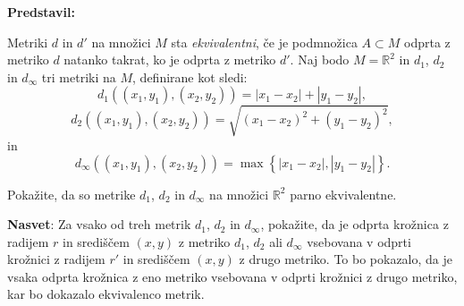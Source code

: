 \textbf{Predstavil: }

Metriki $d$ in $d'$ na množici $M$ sta \emph{ekvivalentni}, če je podmnožica $A \subset M$ odprta z metriko $d$ natanko takrat, ko je odprta z metriko $d'$.
Naj bodo $M = \mathbb{R}^{2}$ in $d_{1}$, $d_{2}$ in $d_{\infty}$ tri metriki na $M$, definirane kot sledi: \[d_{1} \left( (x_{1}, y_{1}), (x_{2}, y_{2}) \right) = |x_{1} - x_{2}| + |y_{1} - y_{2}|,\] \[d_{2} \left( (x_{1}, y_{1}), (x_{2}, y_{2}) \right) = \sqrt{(x_{1} - x_{2})^{2} + (y_{1} - y_{2})^{2}},\] in \[d_{\infty} \left( (x_{1}, y_{1}), (x_{2}, y_{2}) \right) = \max\left\{ |x_{1} - x_{2}|, |y_{1} - y_{2}| \right\}.\]

Pokažite, da so metrike $d_{1}$, $d_{2}$ in $d_{\infty}$ na množici $\mathbb{R}^{2}$ parno ekvivalentne. 

\textbf{Nasvet}: Za vsako od treh metrik $d_{1}$, $d_{2}$ in $d_{\infty}$, pokažite, da je odprta krožnica z radijem $r$ in središčem $(x,y)$ z metriko $d_{1}$, $d_{2}$ ali $d_{\infty}$ vsebovana v odprti krožnici z radijem $r'$ in središčem $(x,y)$ z drugo metriko. To bo pokazalo, da je vsaka odprta krožnica z eno metriko vsebovana v odprti krožnici z drugo metriko, kar bo dokazalo ekvivalenco metrik.